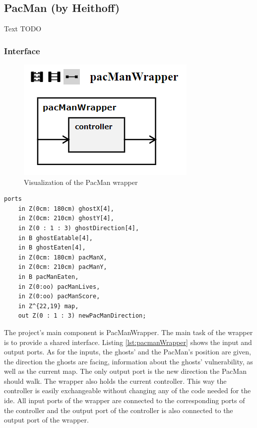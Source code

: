 \subsection{PacMan (by Heithoff)}
Text TODO

\subsubsection{Interface}
\begin{figure}
	\label{fig:visPacmanWrapper}
	\centering
	\includegraphics[scale=0.7]{pictures/VisualizationPacManWrapper.png}
	\caption{Visualization of the PacMan wrapper}
\end{figure}
\begin{lstlisting}[label=lst:pacmanWrapper, caption=Interface of the Pacman Wrapper, morekeywords={ports, port, connect, in, out, instance, ->},
frame=single]
ports 
	in Z(0cm: 180cm) ghostX[4],
	in Z(0cm: 210cm) ghostY[4],
	in Z(0 : 1 : 3) ghostDirection[4],
	in B ghostEatable[4],
	in B ghostEaten[4],
	in Z(0cm: 180cm) pacManX,
	in Z(0cm: 210cm) pacManY,
	in B pacManEaten,
	in Z(0:oo) pacManLives,
	in Z(0:oo) pacManScore,
	in Z^{22,19} map,
	out Z(0 : 1 : 3) newPacManDirection;
\end{lstlisting}
The project's main component is PacManWrapper. The main task of the wrapper is to provide a shared interface. Listing \ref{lst:pacmanWrapper} shows the input and output ports. As for the inputs, the ghosts' and the PacMan's position are given, the direction the ghosts are facing, information about the ghosts' vulnerability, as well as the current map. The only output port is the new direction the PacMan should walk. \newline
The wrapper also holds the current controller. This way the controller is easily exchangeable without changing any of the code needed for the ide. All input ports of the wrapper are connected to the corresponding ports of the controller and the output port of the controller is also connected to the output port of the wrapper. \newline
